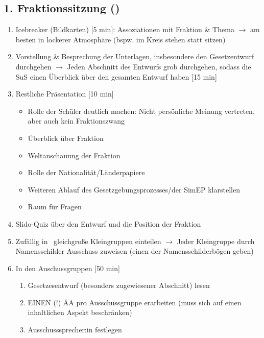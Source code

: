 \documentclass{article}
\begin{document}
	\subsection{1. Fraktionssitzung (\timeFrakOne)}
	\begin{enumerate}
		\item Icebreaker (Bildkarten) [5 min]: \newline Assoziationen mit Fraktion \& Thema \newline
		$\to$ am besten in lockerer Atmosphäre (bspw. im Kreis stehen statt sitzen)
		\item Vorstellung \& Besprechung der Unterlagen, insbesondere den Gesetzentwurf durchgehen \newline $\to$
		Jeden Abschnitt des Entwurfs grob durchgehen, sodass die SuS einen Überblick über den gesamten Entwurf haben [15 min]
		\item Restliche Präsentation [10 min]
		\begin{itemize}
			\item Rolle der Schüler deutlich machen: \newline
            Nicht persönliche Meinung vertreten, aber auch kein Fraktionszwang
			\item Überblick über Fraktion
			\item Weltanschauung der Fraktion
			\item Rolle der Nationalität/Länderpapiere
			\item Weiteren Ablauf des Gesetzgebungsprozesses/der SimEP klarstellen
            \item Raum für Fragen
		\end{itemize}
		\item Slido-Quiz über den Entwurf und die Position der Fraktion \THEMA [10 min]
        \item Zufällig in \anzahlcomm\ gleichgroße Kleingruppen einteilen \newline $\to$
        Jeder Kleingruppe durch Namensschilder Ausschuss zuweisen (einen der Namensschilderbögen geben)
		\item In den Auschussgruppen [50 min]
		\begin{enumerate}
			\item Gesetzesentwurf (besonders zugewiesener Abschnitt) lesen
			\item EINEN (!) ÄA pro Ausschussgruppe erarbeiten \newline (muss sich auf einen inhaltlichen Aspekt beschränken)
	        \item Ausschusssprecher:in festlegen		

\end{enumerate}
\end{enumerate}
\end{document}
